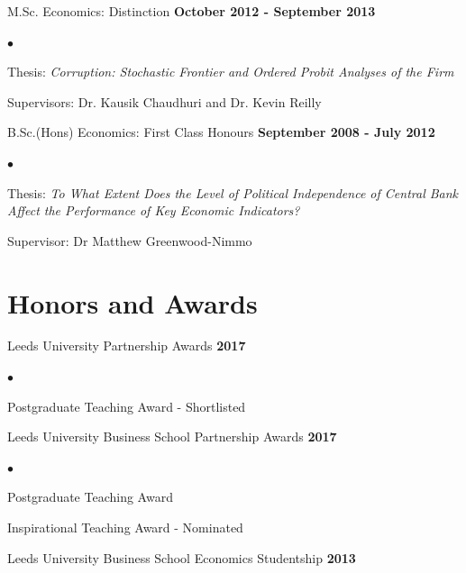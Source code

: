 \documentclass[margin,line,9pt]{res}
\newenvironment{list1}{
  \begin{list}{\ding{113}}{%
      \setlength{\itemsep}{0in}
      \setlength{\parsep}{0in} \setlength{\parskip}{0in}
      \setlength{\topsep}{0in} \setlength{\partopsep}{0in} 
      \setlength{\leftmargin}{0.17in}}}{\end{list}}
\newenvironment{list2}{
  \begin{list}{$\bullet$}{%
      \setlength{\itemsep}{0in}
      \setlength{\parsep}{0in} \setlength{\parskip}{0in}
      \setlength{\topsep}{0in} \setlength{\partopsep}{0in} 
      \setlength{\leftmargin}{0.2in}}}{\end{list}}
\begin{document}
\begin{resume}
\vspace*{.1in}
\begin{list1}
\item[] M.Sc. Economics: Distinction \hfill {\bf October 2012 - September 2013}
\vspace*{.05in}
\begin{list2}
\item Thesis: \textit{Corruption: Stochastic Frontier and Ordered Probit Analyses of the Firm}
\item Supervisors:  Dr. Kausik Chaudhuri and Dr. Kevin Reilly
\end{list2}
\end{list1}

\vspace*{.1in}
\begin{list1}
\item[] B.Sc.(Hons) Economics: First Class Honours \hfill {\bf September 2008 - July 2012}
\vspace*{.05in}
\begin{list2}
\item Thesis: \textit{To What Extent Does the Level of Political Independence of Central Bank Affect the Performance of Key Economic Indicators?}
\item Supervisor: Dr Matthew Greenwood-Nimmo
\end{list2}
\end{list1}


\section{\sc Honors and Awards} 
Leeds University Partnership Awards \hfill {\bf 2017}\\
\vspace*{-.1in}
\begin{list2}
\item Postgraduate Teaching Award - Shortlisted
\end{list2}

Leeds University Business School Partnership Awards \hfill {\bf 2017}\\
\vspace*{-.1in}
\begin{list2}
\item Postgraduate Teaching Award 
\item Inspirational Teaching Award - Nominated

\end{list2}

Leeds University Business School Economics Studentship \hfill {\bf 2013}


\end{resume}
\end{document}

